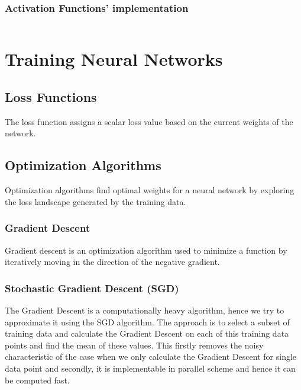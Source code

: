 \documentclass[a4paper,12pt]{article}
\begin{document}
\subsubsection{Activation Functions' implementation}
\inputminted[frame=lines, fontsize=\scriptsize, linenos]{python}{../../blue/activation_functions/activation_functions.py}

\section{Training Neural Networks}

\subsection{Loss Functions}
\begin{tcolorbox}[colback=blue!5!white,colframe=blue!75!black,title=Loss Function]
  The loss function assigns a scalar loss value based on the current weights of the network.
\end{tcolorbox}

\subsection{Optimization Algorithms}
Optimization algorithms find optimal weights for a neural network by exploring the loss
landscape generated by the training data.

\subsubsection{Gradient Descent}
\begin{tcolorbox}[colback=blue!5!white,colframe=blue!75!black,title=Gradient Descent]
  Gradient descent is an optimization algorithm used to minimize a function by iteratively moving in the 
  direction of the negative gradient.
\end{tcolorbox}

\subsubsection{Stochastic Gradient Descent (SGD)}
The Gradient Descent is a computationally heavy algorithm, hence we try to approximate it using the 
SGD algorithm. The approach is to select a subset of training data and calculate the Gradient Descent
on each of this training data points and find the mean of these values. This firstly removes the noisy 
characteristic of the case when we only calculate the Gradient Descent for single data point and secondly,
it is implementable in parallel scheme and hence it can be computed fast.
\end{document}
